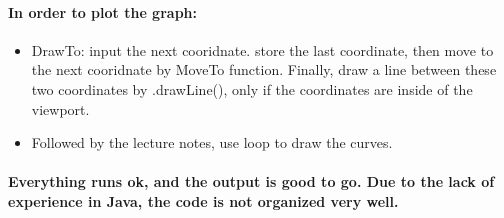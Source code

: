 \documentclass[a4paper,12pt]{texMemo}
\begin{document}
\paragraph{In order to plot the graph: }
\begin{itemize}
	\item DrawTo: input the next cooridnate. store the last coordinate, then move to the next cooridnate by MoveTo function. Finally, draw a line between these two coordinates by .drawLine(), only if the coordinates are inside of the viewport.
	\item  Followed by the lecture notes, use loop to draw the curves.
\end{itemize}

\paragraph{Everything runs ok, and the output is good to go. Due to the lack of experience in Java, the code is not organized very well.}
\end{document}
